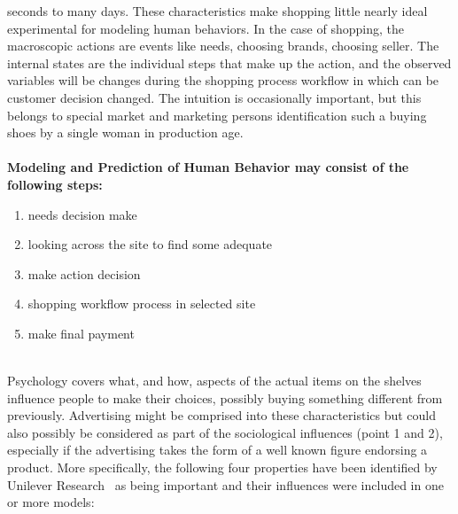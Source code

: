 seconds to many days.
These characteristics make shopping little nearly ideal experimental for modeling human behaviors.
In the case of shopping, the macroscopic actions are events like needs, choosing brands, choosing seller.
The internal states are the individual steps that make up the action, and the observed variables will be changes during the shopping process
workflow in which can be customer decision changed.
The intuition is occasionally important, but this belongs to special market and marketing persons identification such
a buying shoes by a single woman in production age.\\
\\
\textbf{Modeling and Prediction of Human Behavior may consist of the following steps:}\\
\begin{enumerate}
	\item needs decision make
	\item looking across the site to find some adequate
	\item make action decision
	\item shopping workflow process in selected site
	\item make final payment
\end{enumerate}
\\
Psychology covers what, and how, aspects of the actual items on the shelves influence people to make their choices,
possibly buying something different from previously.
Advertising might be comprised into these characteristics but could also possibly be considered as part of the sociological
influences (point 1 and 2), especially if the advertising takes the form of a well known figure endorsing a product.
More specifically, the following four properties have been identified by Unilever Research~\cite{patel} as being important
and their influences were included in one or more models:

